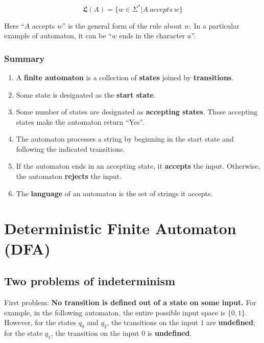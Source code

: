 \documentclass[12pt, letterpaper, oneside]{book}
\begin{document}
\[
  \mathfrak{L}(A) = \{ w \in \Sigma^* | A \ accepts \ w \}
\]

Here ``$A$ accepts $w$'' is the general form of the rule about $w$. In a particular example of automaton, it can be
``$w$ ends in the character $a$''.

\subsubsection{Summary}

\begin{enumerate}
  \item A \textbf{finite automaton} is a collection of \textbf{states} joined by \textbf{transitions}.
  \item Some state is designated as the \textbf{start state}.
  \item Some number of states are designated as \textbf{accepting states}. These accepting states make the automaton
        return ``Yes''.
  \item The automaton processes a string by beginning in the start state and following the indicated transitions.
  \item If the automaton ends in an accepting state, it \textbf{accepts} the input. Otherwise, the automaton
        \textbf{rejects} the input.
  \item The \textbf{language} of an automaton is the set of strings it accepts.
\end{enumerate}

\section{Deterministic Finite Automaton (DFA)}

\subsection{Two problems of indeterminism}

First problem: \textbf{No transition is defined out of a state on some input.} For example, in the following automaton,
the entire possible input space is $\{0, 1\}$. However, for the states $q_0$ and $q_2$, the transitions on the input
$1$ are \textbf{undefined}; for the state $q_1$, the transition on the input $0$ is \textbf{undefined}.
\end{document}
